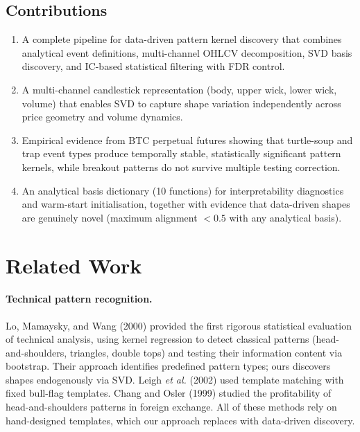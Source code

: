 \documentclass[11pt,a4paper]{article}
\theoremstyle{definition}
\theoremstyle{plain}
\begin{document}
\subsection{Contributions}

\begin{enumerate}
    \item A complete pipeline for data-driven pattern kernel discovery that
          combines analytical event definitions, multi-channel OHLCV
          decomposition, SVD basis discovery, and IC-based statistical
          filtering with FDR control.
    \item A multi-channel candlestick representation (body, upper wick,
          lower wick, volume) that enables SVD to capture shape variation
          independently across price geometry and volume dynamics.
    \item Empirical evidence from BTC perpetual futures showing that
          turtle-soup and trap event types produce temporally stable,
          statistically significant pattern kernels, while breakout patterns
          do not survive multiple testing correction.
    \item An analytical basis dictionary (10 functions) for interpretability
          diagnostics and warm-start initialisation, together with evidence
          that data-driven shapes are genuinely novel (maximum alignment
          $< 0.5$ with any analytical basis).
\end{enumerate}

\section{Related Work}
\label{sec:related}

\paragraph{Technical pattern recognition.}
Lo, Mamaysky, and Wang (2000) provided the first rigorous statistical
evaluation of technical analysis, using kernel regression to detect
classical patterns (head-and-shoulders, triangles, double tops) and testing
their information content via bootstrap. Their approach identifies
predefined pattern types; ours discovers shapes endogenously via SVD.
Leigh \emph{et al.} (2002) used template matching with fixed bull-flag
templates. Chang and Osler (1999) studied the profitability of
head-and-shoulders patterns in foreign exchange. All of these methods rely
on hand-designed templates, which our approach replaces with data-driven
discovery.
\end{document}
